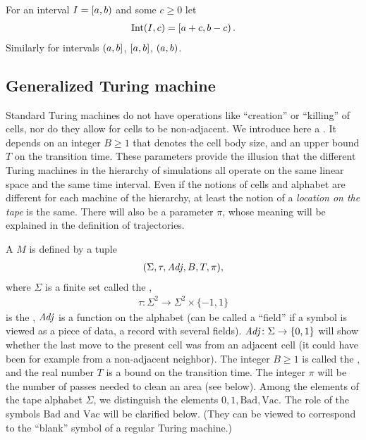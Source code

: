 \documentclass[11pt]{memoir}
\theoremstyle{definition} %
\renewcommand{\ge}{\geq}
\newcommand{\fld}[1]{\ensuremath{\textit{#1\/}}}
\def\B{B}
\newcommand{\Bad}{\mathrm{Bad}}
\newcommand{\Vacant}{\mathrm{Vac}}
\newcommand{\Int}{\mathrm{Int}}
\newcommand{\passno}{\pi}
\newcommand{\Tu}{T}
\newcommand{\Adj}{\fld{Adj}}
\begin{document}
\begin{notation}
  For an interval \( I=\left[a,b\right) \) and some \( c\ge 0 \) let
  \begin{align*}
   \Int(I,c) = \lint{a+c}{b-c}.
  \end{align*}
  Similarly for intervals \( (a,b] \), \( [a,b] \), \( (a,b) \).
\end{notation}

\subsection{Generalized Turing machine}\label{sec:gen-TM}

Standard Turing machines do not have
operations like ``creation'' or ``killing'' of cells, nor
do they allow for cells to be non-adjacent.
We introduce here a .
It depends on an integer \( \B \ge 1 \) that denotes the cell body size,
and an upper bound \( \Tu \) on the transition time.
These parameters provide the illusion that the different Turing
machines in the hierarchy of simulations all operate on the same linear space and the same time
interval.
Even if the notions of cells and alphabet are different for each machine of the hierarchy, 
at least the notion of a \emph{location on the tape} is the same.
There will also be a  parameter \( \passno \),
whose meaning will be explained in the definition of trajectories.


\begin{definition}\label{def:gen-TM}
    A  \( M \) is defined by a tuple
        \begin{align}\label{eq:gen-TM}
             (\Sigma, \tau, \Adj,\B, \Tu, \passno),
       \end{align}
    where \( \Sigma \) is a finite set called the ,
        \begin{align*}
             \tau: \Sigma^{2}\to \Sigma^{2}\times\{-1,1\}
        \end{align*}
    is the ,
\( \Adj \) is a function on the alphabet (can be called a ``field'' if a symbol is viewed 
as a piece of data, a record with several fields).
\( \Adj\colon\Sigma\to\{ 0, 1 \} \) will show 
whether the last move to the present cell was from an adjacent cell (it could have been for example
from a non-adjacent neighbor).
The integer \( \B\ge 1 \) is called the ,
and the real number \( \Tu \) is a bound on the transition time.
The integer \( \passno \) will be the number of passes needed to clean an area (see below).
Among the elements of the tape alphabet \( \Sigma \), 
we distinguish the elements \( 0,1,\Bad,\Vacant \).
The role of the symbols \( \Bad \) and \( \Vacant \) will be clarified below.
(They can be viewed to correspond to the ``blank'' symbol of a regular Turing machine.)
\end{definition}
\end{document}
